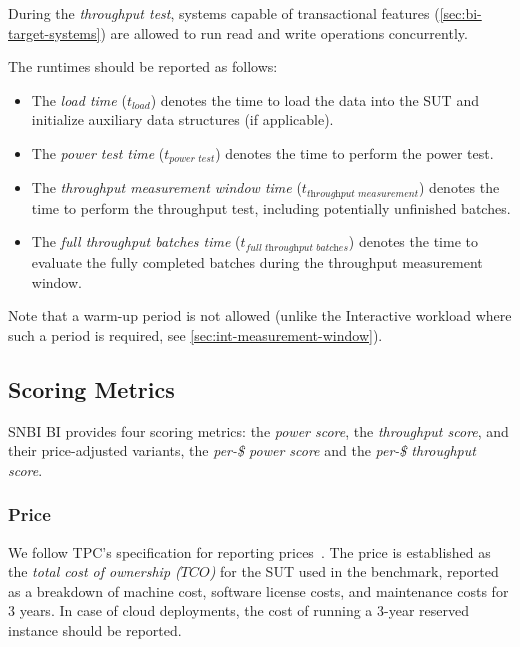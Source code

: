 During the \emph{throughput test}, systems capable of transactional features (\autoref{sec:bi-target-systems}) are allowed to run read and write operations concurrently.

The runtimes should be reported as follows:
\begin{itemize}
    \item The \emph{load time} ($t_\textit{load}$) denotes the time to load the data into the SUT and initialize auxiliary data structures (if applicable).
    \item The \emph{power test time} ($t_\textit{power test}$) denotes the time to perform the power test.
    \item The \emph{throughput measurement window time} ($t_\textit{throughput\ measurement}$) denotes the time to perform the throughput test, including potentially unfinished batches.
    \item The \emph{full throughput batches time} ($t_\textit{full\ throughput\ batches}$) denotes the time to evaluate the fully completed batches during the throughput measurement window.
\end{itemize}

Note that a warm-up period is not allowed (unlike the Interactive workload where such a period is required, see \autoref{sec:int-measurement-window}).

\subsection{Scoring Metrics}
\label{sec:bi-scoring-metrics}

SNBI BI provides four scoring metrics:
the \emph{power score}, the \emph{throughput score}, and their price-adjusted variants,
the \emph{per-\$ power score} and the \emph{per-\$ throughput score}.

\subsubsection{Price}
\label{sec:price-metrics}

We follow TPC's specification for reporting prices~\cite{tpc-pricing}.
The price is established as the \emph{total cost of ownership ($\textit{TCO}$)} for the SUT used in the benchmark,
reported as a breakdown of
machine cost,
software license costs,
and maintenance costs for 3 years.
In case of cloud deployments, the cost of running a 3-year reserved instance %
should be reported.

